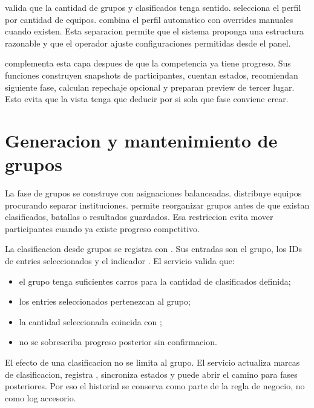  valida que la cantidad de grupos y clasificados tenga sentido.  selecciona el perfil por cantidad de equipos.  combina el perfil automatico con overrides manuales cuando existen. Esta separacion permite que el sistema proponga una estructura razonable y que el operador ajuste configuraciones permitidas desde el panel.

 complementa esta capa despues de que la competencia ya tiene progreso. Sus funciones construyen snapshots de participantes, cuentan estados, recomiendan siguiente fase, calculan repechaje opcional y preparan preview de tercer lugar. Esto evita que la vista tenga que deducir por si sola que fase conviene crear.

\section{Generacion y mantenimiento de grupos}
\label{sec:servicios-grupos}

La fase de grupos se construye con asignaciones balanceadas.  distribuye equipos procurando separar instituciones.  permite reorganizar grupos antes de que existan clasificados, batallas o resultados guardados. Esa restriccion evita mover participantes cuando ya existe progreso competitivo.

La clasificacion desde grupos se registra con . Sus entradas son el grupo, los IDs de entries seleccionados y el indicador . El servicio valida que:

\begin{itemize}
  \item el grupo tenga suficientes carros para la cantidad de clasificados definida;
  \item los entries seleccionados pertenezcan al grupo;
  \item la cantidad seleccionada coincida con ;
  \item no se sobrescriba progreso posterior sin confirmacion.
\end{itemize}

El efecto de una clasificacion no se limita al grupo. El servicio actualiza marcas de clasificacion, registra , sincroniza estados y puede abrir el camino para fases posteriores. Por eso el historial se conserva como parte de la regla de negocio, no como log accesorio.

